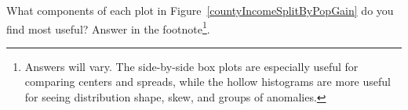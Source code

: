 \begin{exercise}
What components of each plot in Figure~\ref{countyIncomeSplitByPopGain} do you find most useful? Answer in the footnote\footnote{Answers will vary. The side-by-side box plots are especially useful for comparing centers and spreads, while the hollow histograms are more useful for seeing distribution shape, skew, and groups of anomalies.}.
\end{exercise}




%
%
%
%
%
